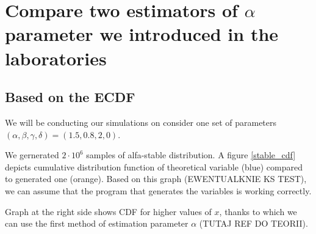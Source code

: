 \documentclass{article}
\begin{document}
		\section{Compare two estimators of $\alpha$ parameter we introduced in the laboratories}
		
		
		\subsection{Based on the ECDF}
		
		We will be conducting our simulations on consider one set of parameters $(\alpha, \beta , \gamma, \delta) = (1.5, 0.8, 2, 0)$.
		
		We gernerated $2\cdot10^6$ samples of alfa-stable distribution. A figure \ref{stable_cdf} depicts cumulative distribution function of theoretical variable (blue) compared to generated one (orange). Based on this graph (EWENTUALKNIE KS TEST), we can assume that the program that generates the variables is working correctly.
		
		Graph at the right side shows CDF for higher values of $x$, thanks to which we can use the first method of estimation parameter $\alpha$ (TUTAJ REF DO TEORII).    
		
\end{document}
